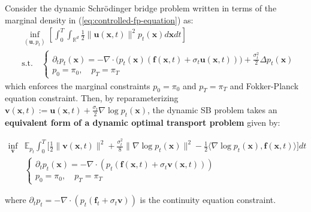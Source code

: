 \documentclass{article}
\begin{document}
\begin{proposition}
    Consider the dynamic Schrödinger bridge problem written in terms of the marginal density in (\ref{eq:controlled-fp-equation}) as:
    \begin{align}
        &\inf_{(\boldsymbol{u}, p_t)}\left[\int_0^T\int_{\mathbb{R}^d}\frac{1}{2}\|\boldsymbol{u}(\boldsymbol{x},t)\|^2p_t(\boldsymbol{x}) d\boldsymbol{x}dt\right]\tag{Density Dynamic SB Objective}\label{eq:nonlinear-sbp-density-proof}\\ &\text{s.t.}\quad \begin{cases}
            \partial_tp_t(\boldsymbol{x})=-\nabla\cdot\big(p_t(\boldsymbol{x})(\boldsymbol{f}(\boldsymbol{x},t) +\sigma_t\boldsymbol{u}(\boldsymbol{x},t))\big)+\frac{\sigma_t^2}{2}\Delta p_t(\boldsymbol{x})\\
            p_0= \pi_0, \quad p_T=\pi_T
        \end{cases}\nonumber
    \end{align}
    which enforces the marginal constraints $p_0=\pi_0$ and $p_T=\pi_T$ and Fokker-Planck equation constraint. Then, by reparameterizing $\boldsymbol{v}(\boldsymbol{x},t):=\boldsymbol{u}(\boldsymbol{x},t)+\frac{\sigma_t}{2}\nabla \log p_t(\boldsymbol{x})$, the dynamic SB problem takes an \textbf{equivalent form of a dynamic optimal transport problem} given by:
    \begin{small}
    \begin{align}
        \inf_{\boldsymbol{v}}&\mathbb{E}_{p_t}\int_0^T\bigg[\frac{1}{2}\|\boldsymbol{v}(\boldsymbol{x},t)\|^2+\frac{\sigma^2_t}{8}\|\nabla \log p_t(\boldsymbol{x})\|^2-\frac{1}{2}\langle\nabla \log p_t(\boldsymbol{x}), \boldsymbol{f}(\boldsymbol{x},t)\rangle\bigg]dt\tag{Entropy-Regularized Dynamic OT}\label{eq:entropy-regularized-dynamic-ot}\\
        &\begin{cases}
            \partial_tp_t(\boldsymbol{x})=-\nabla \cdot (p_t(\boldsymbol{f}(\boldsymbol{x},t)+\sigma_t\boldsymbol{v}(\boldsymbol{x},t)))\\
            p_0=\pi_0, \quad p_T=\pi_T
        \end{cases}\nonumber
    \end{align}
    \end{small}
    where $\partial_tp_t=-\nabla \cdot (p_t(\boldsymbol{f}_t+\sigma_t\boldsymbol{v}))$ is the continuity equation constraint. 
\end{proposition}
\end{document}
